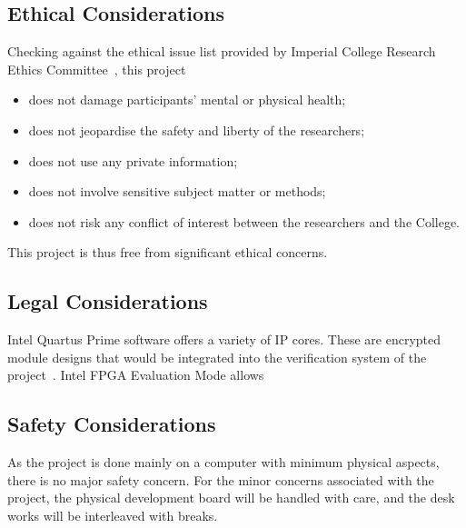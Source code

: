 \documentclass[journal]{IEEEtran}
\begin{document}
\subsection{Ethical Considerations}

Checking against the ethical issue list provided by Imperial College Research
Ethics Committee~\cite{Imperial1}, this project
\begin{itemize}
  \item does not damage participants' mental or physical health;
  \item does not jeopardise the safety and liberty of the researchers;
  \item does not use any private information;
  \item does not involve sensitive subject matter or methods;
  \item does not risk any conflict of interest between the researchers and
        the College.
\end{itemize}
This project is thus free from significant ethical concerns.

\subsection{Legal Considerations}
Intel Quartus Prime software offers a variety of IP cores.
These are encrypted module designs that would be integrated into the
verification system of the project~\cite{Intel2}.
Intel FPGA Evaluation Mode allows

\subsection{Safety Considerations}
As the project is done mainly on a computer with minimum physical aspects,
there is no major safety concern.
For the minor concerns associated with the project, 
the physical development board will be handled with care, and the desk works
will be interleaved with breaks.
\end{document}
